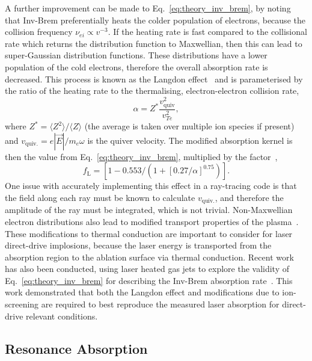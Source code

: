 A further improvement can be made to Eq.~\ref{eq:theory_inv_brem}, by noting that \ac{Inv-Brem} preferentially heats the colder population of electrons, because the collision frequency $\nu_{ei}\propto v^{-3}$.
If the heating rate is fast compared to the collisional rate which returns the distribution function to Maxwellian, then this can lead to super-Gaussian distribution functions.
These distributions have a lower population of the cold electrons, therefore the overall absorption rate is decreased.
This process is known as the Langdon effect~\cite{langdon_nonlinear_1980} and is parameterised by the ratio of the heating rate to the thermalising, electron-electron collision rate,
\begin{equation}
    \label{eq:theory_alpha_langdon}
    \alpha = Z^* \frac{v_{\text{quiv}}^2}{v_{Te}^2},
\end{equation}
where $Z^* = \langle Z^2 \rangle / \langle Z \rangle $ (the average is taken over multiple ion species if present) and $v_{\text{quiv.}} = e|\vec{E}|/m_e \omega$ is the quiver velocity.
The modified absorption kernel is then the value from Eq.~\ref{eq:theory_inv_brem}, multiplied by the factor~\cite{colaitis_inverse_2021},
\begin{equation}
    f_{\text{L}} = \left[ 1 - 0.553/\left( 1 + {[0.27/\alpha]}^{0.75} \right) \right].
\end{equation}
One issue with accurately implementing this effect in a ray-tracing code is that the field along each ray must be known to calculate $v_{\text{quiv.}}$, and therefore the amplitude of the ray must be integrated, which is not trivial.
Non-Maxwellian electron distributions also lead to modified transport properties of the plasma~\cite{ridgers_transport_2008}.
These modifications to thermal conduction are important to consider for laser direct-drive implosions, because the laser energy is transported from the absorption region to the ablation surface via thermal conduction.
Recent work has also been conducted, using laser heated gas jets to explore the validity of Eq.~\ref{eq:theory_inv_brem} for describing the \ac{Inv-Brem} absorption rate~\cite{turnbull_inverse_2023}.
This work demonstrated that both the Langdon effect and modifications due to ion-screening are required to best reproduce the measured laser absorption for direct-drive relevant conditions.

\subsection{Resonance Absorption}%
\label{sec:theory_res_abs}

